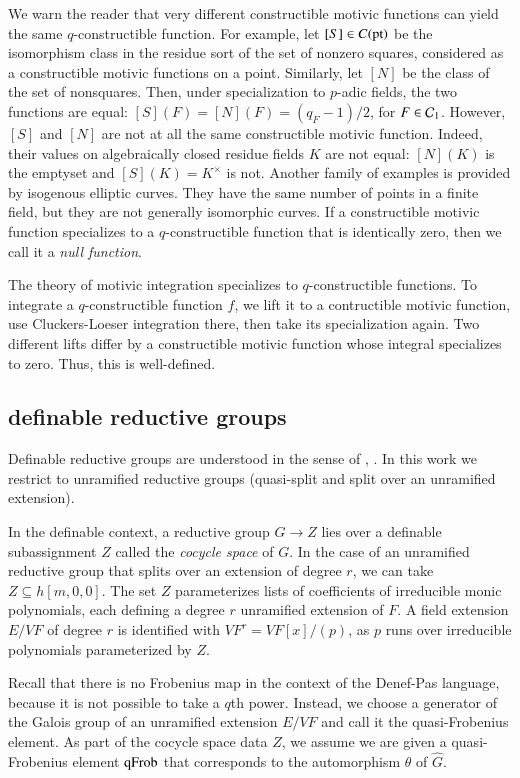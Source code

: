 We warn the reader that
very different constructible motivic functions can yield the same $q$-constructible function.  For example,
let $[S]\in C({\operatorname{pt}})$ be the isomorphism class in the residue sort of the set of nonzero squares, considered as a 
constructible motivic functions on a point.  Similarly, let $[N]$ be the class of the set of nonsquares.  Then, under specialization
to $p$-adic fields, the
two functions are equal:
$[S](F) = [N](F) = (q_F-1)/2$, for $F\in\mathcal C_1$. However, $[S]$ and $[N]$ are not at all the same constructible motivic function. Indeed,  their values on 
algebraically closed residue fields $K$ are not equal: $[N](K)$ is the emptyset and $[S](K) = K^\times$ is not.
Another family of examples is provided by isogenous elliptic curves.  They have the same number of points in a finite field, but
they are not generally isomorphic curves.
If a constructible motivic function specializes to a $q$-constructible function that is identically zero, then we call
it a {\it null function}.

The theory of motivic integration specializes to $q$-constructible functions. To integrate a $q$-constructible function $f$, we lift it to 
a contructible motivic function, use Cluckers-Loeser integration there, then take its specialization again.
Two different lifts differ by a constructible motivic function whose integral specializes to zero. Thus, this
is well-defined.

\subsection{definable reductive groups}

Definable reductive groups are understood in the sense of \cite{cluckers2011transfer}, \cite{gordon}.
In this work we restrict to unramified reductive groups (quasi-split and split over an unramified extension).

In the definable context, a reductive group $G\to Z$ lies over a definable subassignment
$Z$ called the {\it cocycle space} of $G$.  In the case of an unramified reductive group that splits over an extension of degree $r$, 
we can take $Z\subseteq h[m,0,0]$.  
The set $Z$ parameterizes lists of coefficients of irreducible monic 
polynomials, each  defining a degree $r$ unramified extension of $F$.  A field extension $E/VF$ of degree $r$ is identified
with $VF^r = VF[x]/(p)$, as $p$ runs over irreducible polynomials parameterized by $Z$.


Recall that there is no Frobenius map in the context of the Denef-Pas language, because it is not possible to take a $q$th power.
Instead, we choose a generator of the Galois group of an unramified extension $E/VF$ and call it the quasi-Frobenius element.
As part of the cocycle space data $Z$, we assume we are given a quasi-Frobenius element ${\operatorname{qFrob}}$ that corresponds
to the automorphism $\theta$ of $\hat G$.  


